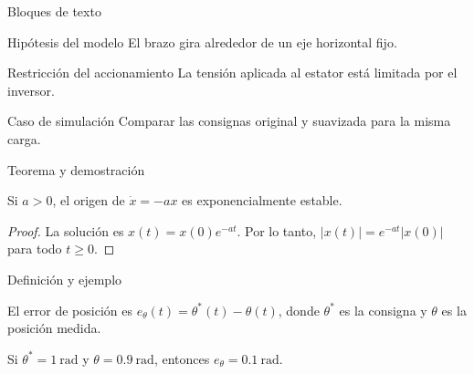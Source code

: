 \documentclass{beamer}
\newif\ifejemplos
\begin{document}
\ifejemplos
\appendix


\begin{frame}{Bloques de texto}
  \begin{block}{Hipótesis del modelo}
    El brazo gira alrededor de un eje horizontal fijo.
  \end{block}

  \begin{alertblock}{Restricción del accionamiento}
    La tensión aplicada al estator está limitada por el inversor.
  \end{alertblock}

  \begin{exampleblock}{Caso de simulación}
    Comparar las consignas original y suavizada para la misma carga.
  \end{exampleblock}
\end{frame}

\begin{frame}{Teorema y demostración}
  \begin{theorem}
    Si $a>0$, el origen de $\dot{x}=-ax$ es exponencialmente estable.
  \end{theorem}

  \begin{proof}
    La solución es $x(t)=x(0)e^{-at}$. Por lo tanto,
    $\lvert x(t)\rvert=e^{-at}\lvert x(0)\rvert$ para todo $t\geq 0$.
  \end{proof}
\end{frame}

\begin{frame}{Definición y ejemplo}
  \begin{definition}
    El error de posición es $e_\theta(t)=\theta^\ast(t)-\theta(t)$,
    donde $\theta^\ast$ es la consigna y $\theta$ es la posición medida.
  \end{definition}

  \begin{example}
    Si $\theta^\ast=\qty{1}{\radian}$ y $\theta=\qty{0.9}{\radian}$,
    entonces $e_\theta=\qty{0.1}{\radian}$.
  \end{example}
\end{frame}
\end{document}
